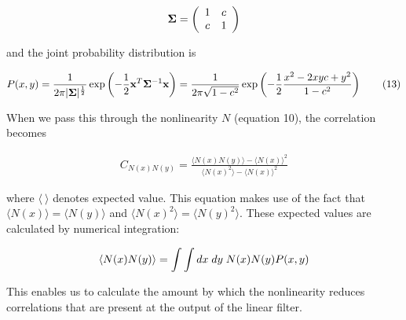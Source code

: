 \documentclass[12pt]{article}
\begin{document}
\[ {\bf\Sigma} = \left( \begin{array}{cc}
1 & c \\
c & 1 \\
\end{array} \right) \]

\noindent and the joint probability distribution is

\begin{align}
\displaystyle P(x,y) = \frac{1}{2\pi |{\bf \Sigma}|^{\frac{1}{2}}}\exp\left( -\frac{1}{2}{\bf x}^T {\bf \Sigma}^{-1} {\bf x}\right)=\frac{1}{2\pi \sqrt{1-c^2}}\exp\left( -\frac{1}{2}\frac{x^2-2xyc+y^2}{1-c^2}\right) \tag{13}
\end{align}

\noindent When we pass this through the nonlinearity $N$ (equation 10), the correlation becomes

\begin{align}
\displaystyle C_{N(x)N(y)} = \frac{\langle N(x)N(y)\rangle- \langle N(x)\rangle^2}{\langle N(x)^2 \rangle - \langle N(x) \rangle^2} \tag{12}
\end{align}

\noindent where $\langle \:\rangle$ denotes expected value. This equation makes use of the fact that $\langle N(x) \rangle = \langle N(y) \rangle$ and $\langle N(x)^2 \rangle = \langle N(y)^2 \rangle$. These expected values are calculated by numerical integration:

\begin{align}
\langle N(x)N(y) \rangle = \int \int dx\;dy\;N(x)N(y)P(x,y) \notag
\end{align}

\noindent This enables us to calculate the amount by which the nonlinearity reduces correlations that are present at the output of the linear filter.
\end{document}

